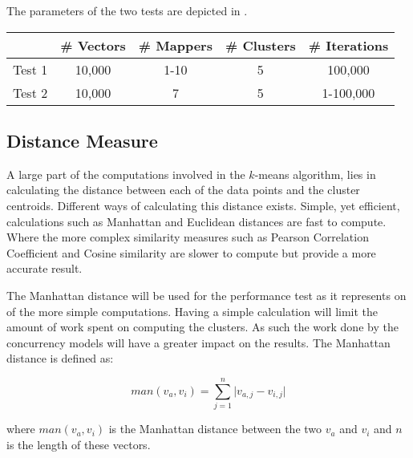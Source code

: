The parameters of the two tests are depicted in .

\begin{center}
\begin{table}[h]
\centering
\begin{tabular}{c|cccc}
       & \# Vectors        & \# Mappers			 	& \# Clusters & \# Iterations \\ \hline
Test 1 & 10,000            & 1-10        			& 5           & 100,000      \\
Test 2 & 10,000			   & 7          			& 5           & 1-100,000
\end{tabular}
\end{table}
 \label{tab:test_description} 
\end{center}

\subsection{Distance Measure}
A large part of the computations involved in the $k$-means algorithm, lies in calculating the distance between each of the data points and the cluster centroids. Different ways of calculating this distance exists. Simple, yet efficient, calculations such as Manhattan and Euclidean\cite[p. 41]{amatriain2011data} distances are fast to compute. Where the more complex similarity measures such as Pearson Correlation Coefficient and Cosine similarity\cite[p. 42]{amatriain2011data}\cite{breese1998empirical} are slower to compute but provide a more accurate result.

The Manhattan distance will be used for the performance test as it represents on of the more simple computations. Having a simple calculation will limit the amount of work spent on computing the clusters. As such the work done by the concurrency models will have a greater impact on the results. The Manhattan distance is defined as:
 
\begin{equation}\label{eq:mandistance}
man(v_a,v_i)=\sum_{j=1}^{n}\lvert v_{a,j}-v_{i,j}\rvert
\end{equation}

where $man(v_a,v_i)$ is the Manhattan distance between the two $v_a$ and $v_i$ and $n$ is the length of these vectors.

